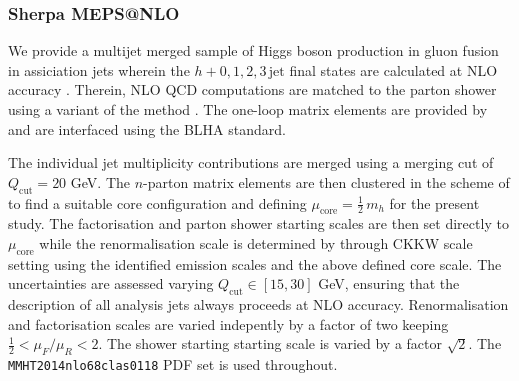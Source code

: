 \subsubsection{Sherpa MEPS@NLO}
\label{sec:hjetscomp:tools:mc:sherpa}

We provide a multijet merged sample of Higgs boson production in 
gluon fusion in assiciation jets wherein the $h+0,1,2,3\,\text{jet}$ 
final states are calculated at NLO accuracy \cite{Gleisberg:2008ta,
  Hoeche:2012yf,Gehrmann:2012yg,Hoeche:2014lxa}. Therein, NLO QCD 
computations are matched to the parton shower using a variant of the 
\MCatNLO method \cite{Hoeche:2011fd,Hoeche:2012ft,Hoche:2012wh}.
The one-loop matrix elements are provided by \GoSam \cite{Cullen:2011ac,
  Cullen:2013saa,Greiner:2015jha} and are interfaced using the BLHA 
\cite{Alioli:2013nda} standard.

The individual jet multiplicity contributions are merged using a merging 
cut of $Q_\text{cut}=20$ GeV. The $n$-parton matrix elements are then 
clustered in the scheme of \cite{Hoeche:2009rj,Hoeche:2012yf,Gehrmann:2012yg} 
to find a suitable core configuration and defining $\mu_\text{core}
=\tfrac{1}{2}\,m_h$ for the present study. The factorisation 
and parton shower starting scales are then set directly to 
$\mu_\text{core}$ while the renormalisation scale is determined by 
through CKKW scale setting using the identified emission scales and 
the above defined core scale.
The uncertainties are assessed varying $Q_\text{cut}\in[15,30]$ GeV, 
ensuring that the description of all analysis jets always proceeds 
at NLO accuracy. Renormalisation and factorisation scales are varied 
indepently by a factor of two keeping $\tfrac{1}{2} < \mu_F/\mu_R < 2$. 
The shower starting starting scale is varied by a factor $\sqrt{2}$. 
The \texttt{MMHT2014nlo68clas0118} PDF set \cite{Harland-Lang:2014zoa} 
is used throughout.

